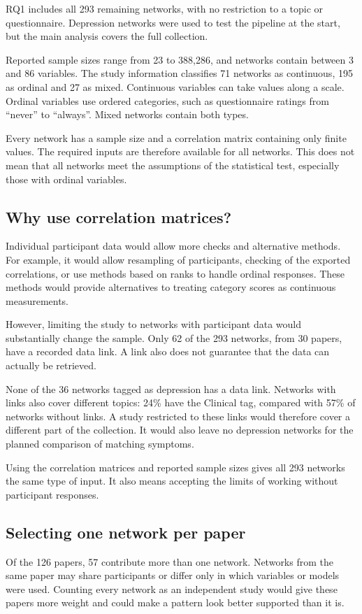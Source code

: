 \documentclass[11pt,a4paper]{article}
\begin{document}
RQ1 includes all 293 remaining networks, with no restriction to a topic or questionnaire. Depression networks were used to test the pipeline at the start, but the main analysis covers the full collection.

Reported sample sizes range from 23 to 388,286, and networks contain between 3 and 86 variables. The study information classifies 71 networks as continuous, 195 as ordinal and 27 as mixed. Continuous variables can take values along a scale. Ordinal variables use ordered categories, such as questionnaire ratings from ``never'' to ``always''. Mixed networks contain both types.

Every network has a sample size and a correlation matrix containing only finite values. The required inputs are therefore available for all networks. This does not mean that all networks meet the assumptions of the statistical test, especially those with ordinal variables.

\subsection{Why use correlation matrices?}
Individual participant data would allow more checks and alternative methods. For example, it would allow resampling of participants, checking of the exported correlations, or use methods based on ranks to handle ordinal responses. These methods would provide alternatives to treating category scores as continuous measurements.

However, limiting the study to networks with participant data would substantially change the sample. Only 62 of the 293 networks, from 30 papers, have a recorded data link. A link also does not guarantee that the data can actually be retrieved.

None of the 36 networks tagged as depression has a data link. Networks with links also cover different topics: 24\% have the Clinical tag, compared with 57\% of networks without links. A study restricted to these links would therefore cover a different part of the collection. It would also leave no depression networks for the planned comparison of matching symptoms.

Using the correlation matrices and reported sample sizes gives all 293 networks the same type of input. It also means accepting the limits of working without participant responses.

\subsection{Selecting one network per paper}
Of the 126 papers, 57 contribute more than one network. Networks from the same paper may share participants or differ only in which variables or models were used. Counting every network as an independent study would give these papers more weight and could make a pattern look better supported than it is.
\end{document}

